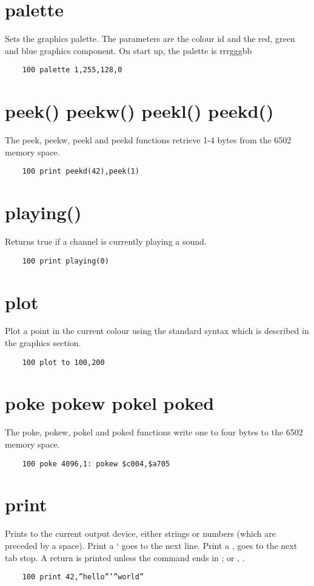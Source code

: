 \section*{palette}
Sets the graphics palette. The parameters are the colour id and the red, green and blue graphics component. On start up, the palette is rrrgggbb
\example{}
\begin{verbatim}
	100 palette 1,255,128,0
\end{verbatim}

\section*{peek() peekw() peekl() peekd() }
The peek, peekw, peekl and peekd functions retrieve 1-4 bytes from the 6502 memory space.
\example{}
\begin{verbatim}
	100 print peekd(42),peek(1)
\end{verbatim}

\section*{playing()}
Returns true if a channel is currently playing a sound.
\example{}
\begin{verbatim}
	100 print playing(0)
\end{verbatim}

\section*{plot}
Plot a point in the current colour using the standard syntax which is described in the graphics section.
\example{}
\begin{verbatim}
	100 plot to 100,200
\end{verbatim}

\section*{poke pokew pokel poked}
The poke, pokew, pokel and poked functions write one to four bytes to the 6502 memory space.
\example{}
\begin{verbatim}
	100 poke 4096,1: pokew $c004,$a705
\end{verbatim}

\section*{print}
Prints to the current output device, either strings or numbers (which are preceded by a space). Print a ‘ goes to the next line. Print a , goes to the next tab stop. A return is printed unless the command ends in ; or , . 
\example{}
\begin{verbatim}
	100 print 42,”hello”’”world”
\end{verbatim}

